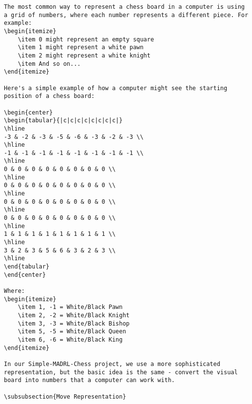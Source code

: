 \documentclass[11pt]{article}
\begin{document}
\begin{lstlisting}[style=Python]
The most common way to represent a chess board in a computer is using a grid of numbers, where each number represents a different piece. For example:
\begin{itemize}
    \item 0 might represent an empty square
    \item 1 might represent a white pawn
    \item 2 might represent a white knight
    \item And so on...
\end{itemize}

Here's a simple example of how a computer might see the starting position of a chess board:

\begin{center}
\begin{tabular}{|c|c|c|c|c|c|c|c|}
\hline
-3 & -2 & -3 & -5 & -6 & -3 & -2 & -3 \\
\hline
-1 & -1 & -1 & -1 & -1 & -1 & -1 & -1 \\
\hline
0 & 0 & 0 & 0 & 0 & 0 & 0 & 0 \\
\hline
0 & 0 & 0 & 0 & 0 & 0 & 0 & 0 \\
\hline
0 & 0 & 0 & 0 & 0 & 0 & 0 & 0 \\
\hline
0 & 0 & 0 & 0 & 0 & 0 & 0 & 0 \\
\hline
1 & 1 & 1 & 1 & 1 & 1 & 1 & 1 \\
\hline
3 & 2 & 3 & 5 & 6 & 3 & 2 & 3 \\
\hline
\end{tabular}
\end{center}

Where:
\begin{itemize}
    \item 1, -1 = White/Black Pawn
    \item 2, -2 = White/Black Knight
    \item 3, -3 = White/Black Bishop
    \item 5, -5 = White/Black Queen
    \item 6, -6 = White/Black King
\end{itemize}

In our Simple-MADRL-Chess project, we use a more sophisticated representation, but the basic idea is the same - convert the visual board into numbers that a computer can work with.

\subsubsection{Move Representation}


\end{lstlisting}
\end{document}
